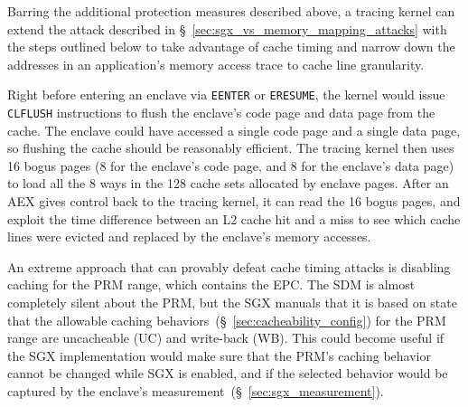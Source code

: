 Barring the additional protection measures described above, a tracing kernel
can extend the attack described in \S~\ref{sec:sgx_vs_memory_mapping_attacks}
with the steps outlined below to take advantage of cache timing and narrow down the
addresses in an application's memory access trace to cache line granularity.

Right before entering an enclave via \texttt{EENTER} or \texttt{ERESUME}, the
kernel would issue \texttt{CLFLUSH} instructions to flush the enclave's code
page and data page from the cache. The enclave could have accessed a single
code page and a single data page, so flushing the cache should be reasonably
efficient. The tracing kernel then uses 16 bogus pages (8 for the enclave's
code page, and 8 for the enclave's data page) to load all the 8 ways in the 128
cache sets allocated by enclave pages. After an AEX gives control back to the
tracing kernel, it can read the 16 bogus pages, and exploit the time difference
between an L2 cache hit and a miss to see which cache lines were evicted and
replaced by the enclave's memory accesses.



An extreme approach that can provably defeat cache timing attacks is disabling
caching for the PRM range, which contains the EPC. The SDM is almost completely
silent about the PRM, but the SGX manuals that it is based on state that
the allowable caching behaviors~(\S~\ref{sec:cacheability_config}) for the PRM
range are uncacheable (UC) and write-back (WB). This could become useful if the
SGX implementation would make sure that the PRM's caching behavior cannot be
changed while SGX is enabled, and if the selected behavior would be captured by
the enclave's measurement~(\S~\ref{sec:sgx_measurement}).
